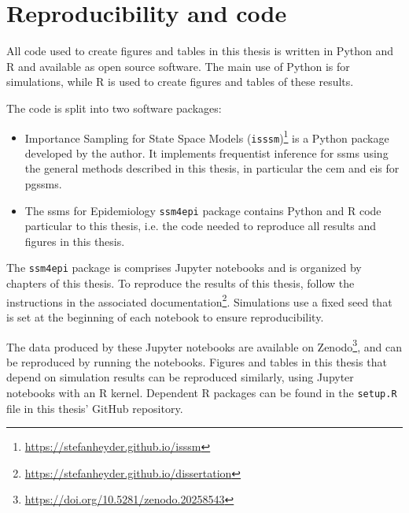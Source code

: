 \chapter{Reproducibility and code}
\label{cha:reproducibility_and_code}
All code used to create figures and tables in this thesis is written in Python \citep{python310} and R \citep{r452} and available as open source software. The main use of Python is for simulations, while R is used to create figures and tables of these results. 

The code is split into two software packages:
\begin{itemize}
    \item Importance Sampling for State Space Models (\texttt{isssm})\footnote{\url{https://stefanheyder.github.io/isssm}} is a Python package developed by the author. It implements frequentist inference for \glspl{ssm} using the general methods described in this thesis, in particular the \gls{cem} and \gls{eis} for \glspl{pgssm}. 
    \item The \glspl{ssm} for Epidemiology \texttt{ssm4epi} package contains Python and R code particular to this thesis, i.e. the code needed to reproduce all results and figures in this thesis. 
\end{itemize}

The \texttt{ssm4epi} package is comprises Jupyter notebooks and is organized by chapters of this thesis. To reproduce the results of this thesis, follow the instructions in the associated documentation\footnote{\url{https://stefanheyder.github.io/dissertation}}. Simulations use a fixed seed that is set at the beginning of each notebook to ensure reproducibility. 

The data produced by these Jupyter notebooks are available on Zenodo\footnote{\href{https://doi.org/10.5281/zenodo.20258543}{https://doi.org/10.5281/zenodo.20258543}}, and can be reproduced by running the notebooks. Figures and tables in this thesis that depend on simulation results can be reproduced similarly, using Jupyter notebooks with an R kernel. Dependent R packages can be found in the \texttt{setup.R} file in this thesis' GitHub repository.